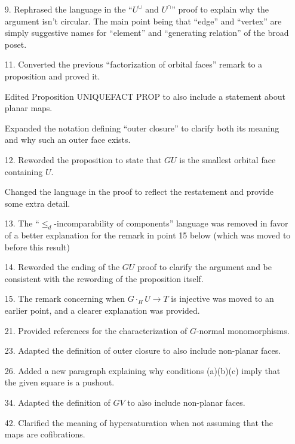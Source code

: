 \documentclass{article}
\begin{document}
\begin{itemize}
\item[9.] Rephrased the language in the ``$U^{\cup}$ and $U^{\cap}$'' proof to explain why the argument isn't circular. The main point being that ``edge'' and ``vertex'' are simply suggestive names for ``element'' and ``generating relation'' of the broad poset.


\item[11.] Converted the previous ``factorization of orbital faces'' remark to a proposition and proved it.

Edited Proposition UNIQUEFACT PROP to also include a statement about planar maps.

Expanded the notation defining ``outer closure'' to clarify both its meaning and why such an outer face exists.


\item[12.] Reworded the proposition to state that $GU$ is the smallest orbital face containing $U$.

Changed the language in the proof to reflect the restatement and provide some extra detail.


\item[13.] The ``$\leq_d$-incomparability of components'' language was removed in favor of a better explanation for the remark in point 15 below (which was moved to before this result)


\item[14.] Reworded the ending of the $GU$ proof to clarify the argument and be consistent with the rewording of the proposition itself.

\item[15.] The remark concerning when $G\cdot_H U \to T$ is injective was moved to an earlier point, and a clearer explanation was provided.

\item[21.] Provided references for the characterization of $G$-normal monomorphisms.
 
\item[23.] Adapted the definition of outer closure to also include non-planar faces.

\item[26.] Added a new paragraph explaining why conditions (a)(b)(c) imply that the given square is a pushout.

\item[34.] Adapted the definition of $GV$ to also include non-planar faces.

\item[42.] Clarified the meaning of hypersaturation when not assuming that the maps are cofibrations.


\end{itemize}
\end{document}
